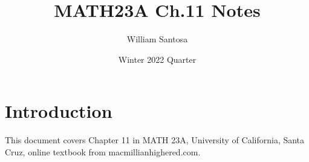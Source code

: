 \documentclass[12pt, letterpaper]{article}
\title{MATH23A Ch.11 Notes}
\author{William Santosa}
\date{Winter 2022 Quarter}
\begin{document}
\maketitle

\section{Introduction}
This document covers Chapter 11 in MATH 23A, University of California, Santa Cruz, online textbook from macmillianhighered.com.
\end{document}
